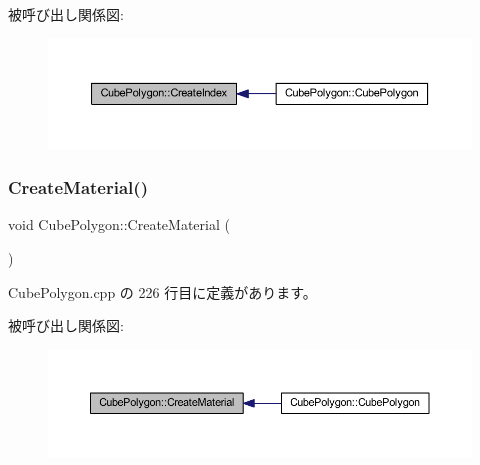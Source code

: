 被呼び出し関係図\+:\nopagebreak
\begin{figure}[H]
\begin{center}
\leavevmode
\includegraphics[width=350pt]{class_cube_polygon_ade2e155c44798710b8e91ac84b02340f_icgraph}
\end{center}
\end{figure}
\mbox{\label{class_cube_polygon_abc3b69a3cb237dec28d0bba9229f0b8d}} 
\subsubsection{\texorpdfstring{Create\+Material()}{CreateMaterial()}}
{\footnotesize\ttfamily void Cube\+Polygon\+::\+Create\+Material (\begin{DoxyParamCaption}{ }\end{DoxyParamCaption})\hspace{0.3cm}{\ttfamily [private]}}



 Cube\+Polygon.\+cpp の 226 行目に定義があります。

被呼び出し関係図\+:\nopagebreak
\begin{figure}[H]
\begin{center}
\leavevmode
\includegraphics[width=350pt]{class_cube_polygon_abc3b69a3cb237dec28d0bba9229f0b8d_icgraph}
\end{center}
\end{figure}
\mbox{\label{class_cube_polygon_ae36048a1ae7b13b6bc8571231b372627}} 

